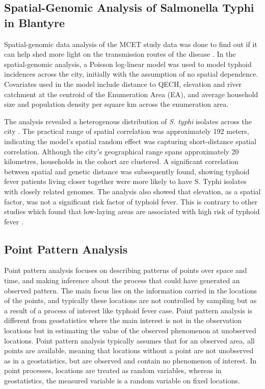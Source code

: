 \subsection{Spatial-Genomic Analysis of Salmonella Typhi in Blantyre}

Spatial-genomic data analysis of the MCET study data was done to find out if it can help shed more light on the transmission routes of the disease \citep{Gauld:2020}. In the spatial-genomic analysis, a Poisson log-linear model was used to model typhoid incidences across the city, initially with the assumption of no spatial dependence. Covariates used in the model include distance to QECH, elevation and river catchment at the centroid of the Enumeration Area (EA), and average household size and population density per square km across the enumeration area.

The analysis revealed a heterogenous distribution of \textit{S. typhi} isolates across the city \citep{Gauld:2022}. The practical range of spatial correlation was approximately 192 meters, indicating the model’s spatial random effect was capturing short-distance spatial correlation. Although the city$'$s geographical range spans approximately 20 kilometres, households in the cohort are clustered. A significant correlation between spatial and genetic distance was subsequently found, showing typhoid fever patients living closer together were more likely to have S. Typhi isolates with closely related genomes. The analysis also showed that elevation, as a spatial factor, was not a significant risk factor of typhoid fever. This is contrary to other studies which found that low-laying areas are associated with high risk of typhoid fever \citep{Akullian:2015}.

\subsection{Point Pattern Analysis}

Point pattern analysis focuses on describing patterns of points over space and time, and making inference about the process that could have generated an observed pattern. The main focus lies on the information carried in the locations of the points, and typically these locations are not controlled by sampling but as a result of a process of interest like typhoid fever case. Point pattern analysis is different from geostatistics where the main interest is not in the observation locations but in estimating the value of the observed phenomenon at unobserved locations. Point pattern analysis typically assumes that for an observed area, all points are available, meaning that locations without a point are not unobserved as in a geostatistics, but are observed and contain no phenomenon of interest. In point processes, locations are treated as random variables, whereas in geostatistics, the measured variable is a random variable on fixed locations.

